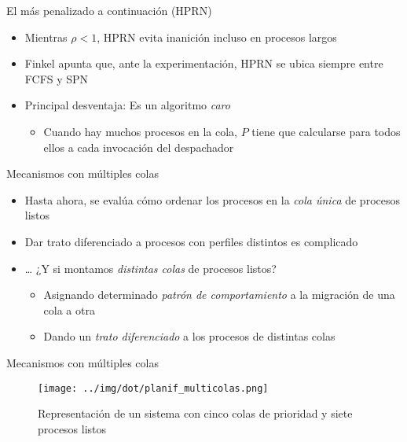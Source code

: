 \documentclass[presentation]{beamer}
\begin{document}
\begin{frame}[label={sec:org5b7c823}]{El más penalizado a continuación (HPRN)}
\begin{itemize}
\item Mientras \(\rho < 1\), HPRN evita inanición incluso en procesos largos
\item Finkel apunta que, ante la experimentación, HPRN se ubica siempre
entre FCFS y SPN
\item Principal desventaja: Es un algoritmo \emph{caro}
\begin{itemize}
\item Cuando hay muchos procesos en la cola, \(P\) tiene que calcularse
para todos ellos a cada invocación del despachador
\end{itemize}
\end{itemize}
\end{frame}


\begin{frame}[label={sec:org0738947}]{Mecanismos con múltiples colas}
\begin{itemize}
\item Hasta ahora, se evalúa cómo ordenar los procesos en la \emph{cola única}
de procesos listos
\item Dar trato diferenciado a procesos con perfiles distintos es complicado
\item \ldots{} ¿Y si montamos \emph{distintas colas} de procesos listos?
\begin{itemize}
\item Asignando determinado \emph{patrón de comportamiento} a la migración de
una cola a otra
\item Dando un \emph{trato diferenciado} a los procesos de distintas colas
\end{itemize}
\end{itemize}
\end{frame}

\begin{frame}[label={sec:org387f731}]{Mecanismos con múltiples colas}
\begin{figure}[htbp]
\centering
\texttt{[image: ../img/dot/planif\_multicolas.png]}
\caption{\label{fig:orgead3854}Representación de un sistema con cinco colas de prioridad y siete procesos listos}
\end{figure}
\end{frame}
\end{document}
